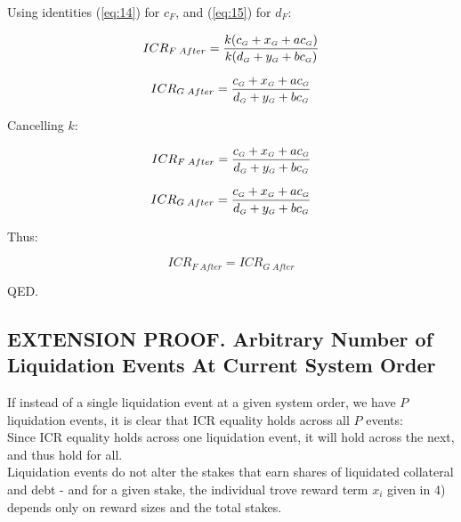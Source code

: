 \documentclass[reqno]{article}
\begin{document}
\bigskip
Using identities (\ref{eq:14}) for $c_F$, and (\ref{eq:15}) for $d_F$:

\begin{equation} 
    ICR_{F \; After}=\frac{k(c_\mathsmaller{G} + x_\mathsmaller{G}+ac_\mathsmaller{G})}{k(d_\mathsmaller{G}+y_\mathsmaller{G}+bc_\mathsmaller{G})}
\end{equation}

\begin{equation} 
    ICR_{G \; After}=\frac{c_\mathsmaller{G}+x_\mathsmaller{G}+ac_\mathsmaller{G}}{d_\mathsmaller{G}+y_\mathsmaller{G}+bc_\mathsmaller{G}}
\end{equation}

\bigskip
Cancelling $k$:

\begin{equation} 
        ICR_{F \; After}=\frac{c_\mathsmaller{G} + x_\mathsmaller{G}+ac_\mathsmaller{G}}{d_\mathsmaller{G}+y_\mathsmaller{G}+bc_\mathsmaller{G}}
\end{equation}

\begin{equation} 
    ICR_{G \; After}=\frac{c_\mathsmaller{G}+x_\mathsmaller{G}+ac_\mathsmaller{G}}{d_\mathsmaller{G}+y_\mathsmaller{G}+bc_\mathsmaller{G}}
\end{equation}

\bigskip
Thus:

\begin{equation} 
    ICR_{F \; After}=ICR_{G \; After}
\end{equation}

\bigskip
QED.

\subsection{EXTENSION PROOF. Arbitrary Number of Liquidation Events At Current System Order}

If instead of a single liquidation event at a given system order, we have $P$ liquidation events, it is clear that ICR equality holds across all $P$ events:\\

Since ICR equality holds across one liquidation event, it will hold across the next, and thus hold for all.\\

Liquidation events do not alter the stakes that earn shares of liquidated collateral and debt - and for a given stake, the individual trove reward term $x_i$ given in 4) depends only on reward sizes and the total stakes.
\end{document}
